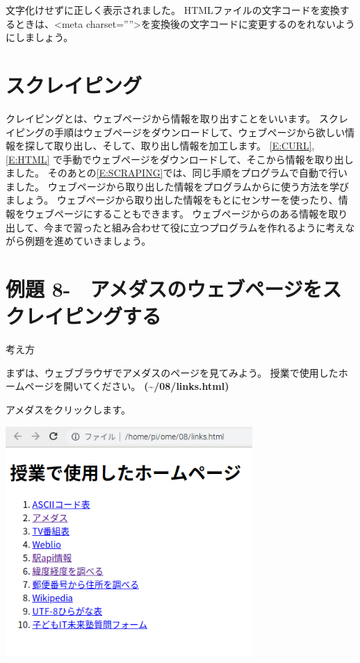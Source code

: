 \documentclass[a4paper,12pt,dvipdfmx]{jarticle}
\newcounter{Exercise}
\renewcommand\theExercise{例題 8-\arabic{Exercise}}
\begin{document}
\bigskip


\bigskip

文字化けせずに正しく表示されました。
HTMLファイルの文字コードを変換するときは、{\textless}meta
charset=””{\textgreater}を変換後の文字コードに変更するのをれないようにしましょう。

\clearpage\section{スクレイピング}
クレイピングとは、ウェブページから情報を取り出すことをいいます。
スクレイピングの手順はウェブページをダウンロードして、ウェブページから欲しい情報を探して取り出し、そして、取り出し情報を加工します。
\ref*{E:CURL},\ref*{E:HTML}
で手動でウェブページをダウンロードして、そこから情報を取り出しました。
そのあとの\ref*{E:SCRAPING}では、同じ手順をプログラムで自動で行いました。
ウェブページから取り出した情報をプログラムからに使う方法を学びましょう。
ウェブページから取り出した情報をもとにセンサーを使ったり、情報をウェブページにすることもできます。
ウェブページからのある情報を取り出して、今まで習ったと組み合わせて役に立つプログラムを作れるように考えながら例題を進めていきましょう。



\bigskip
{}
\clearpage\section{\theExercise　アメダスのウェブページをスクレイピングする}
考え方

まずは、ウェブブラウザでアメダスのページを見てみよう。
授業で使用したホームページを開いてください。
\textbf{({\textasciitilde}/08/links.html)}

アメダスをクリックします。



\begin{center}
\includegraphics[width=9.398cm]{textbook-img017.png}

\end{center}
\end{document}
